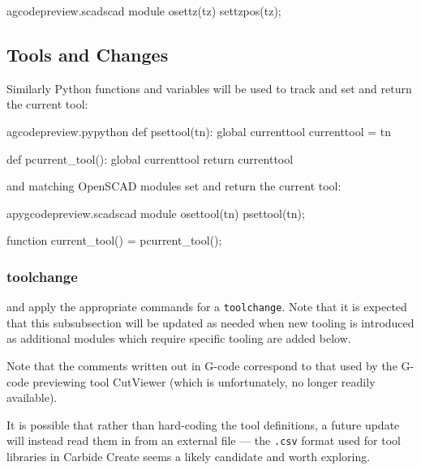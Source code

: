 \documentclass{ltxdoc}
\begin{document}
\lstset{firstnumber=\thegcpscad}
\begin{writecode}{a}{gcodepreview.scad}{scad}
module osettz(tz) {
    settzpos(tz);
}

\end{writecode}
\addtocounter{gcpscad}{4}

\subsection{Tools and Changes}
 
%
Similarly Python functions and variables will be used to track and
set and return the current tool: 
 
\lstset{firstnumber=\thegcpy}
\begin{writecode}{a}{gcodepreview.py}{python}
def psettool(tn):
    global currenttool
    currenttool = tn

def pcurrent_tool():
    global currenttool
    return currenttool

\end{writecode}
\addtocounter{gcpy}{8}
 
\noindent and matching OpenSCAD modules set and return the current tool: 
 
\lstset{firstnumber=\thepyscad}
\begin{writecode}{a}{pygcodepreview.scad}{scad}
module osettool(tn){
    psettool(tn);
}

function current_tool() = pcurrent_tool();

\end{writecode}
\addtocounter{pyscad}{6}
 
\subsubsection{toolchange}
\noindent and apply the appropriate commands for a \texttt{toolchange}.
\label{subsubsec:toolchange}%
Note that it is expected that this subsubsection will be updated as needed when new tooling
is introduced as additional modules which require specific tooling are added below.

Note that the comments written out in G-code correspond to that used by the G-code previewing tool 
CutViewer (which is unfortunately, no longer readily available).

It is possible that rather than hard-coding the tool definitions, a future update will instead
read them in from an external file --- the \texttt{.csv} format used for tool libraries in 
Carbide Create seems a likely candidate and worth exploring.
\end{document}
